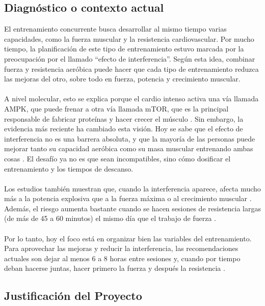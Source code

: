 \subsection{Diagnóstico o contexto actual}
El entrenamiento concurrente busca desarrollar al mismo tiempo varias capacidades, como la fuerza muscular y la resistencia cardiovascular. Por mucho tiempo, la planificación de este tipo de entrenamiento estuvo marcada por la preocupación por el llamado ``efecto de interferencia''. Según esta idea, combinar fuerza y resistencia aeróbica puede hacer que cada tipo de entrenamiento reduzca las mejoras del otro, sobre todo en fuerza, potencia y crecimiento muscular.
\\\\
A nivel molecular, esto se explica porque el cardio intenso activa una vía llamada AMPK, que puede frenar a otra vía llamada mTOR, que es la principal responsable de fabricar proteínas y hacer crecer el músculo \citep{aptavs2025concurrente}. Sin embargo, la evidencia más reciente ha cambiado esta visión. Hoy se sabe que el efecto de interferencia no es una barrera absoluta, y que la mayoría de las personas puede mejorar tanto su capacidad aeróbica como su masa muscular entrenando ambas cosas \citep{fisiologiadelejercicio}. El desafío ya no es que sean incompatibles, sino cómo dosificar el entrenamiento y los tiempos de descanso.
\\\\
Los estudios también muestran que, cuando la interferencia aparece, afecta mucho más a la potencia explosiva que a la fuerza máxima o al crecimiento muscular \citep{fisiologiadelejercicio}. Además, el riesgo aumenta bastante cuando se hacen sesiones de resistencia largas (de más de 45 a 60 minutos) el mismo día que el trabajo de fuerza \citep{aptavs2025concurrente}.
\\\\
Por lo tanto, hoy el foco está en organizar bien las variables del entrenamiento. Para aprovechar las mejoras y reducir la interferencia, las recomendaciones actuales son dejar al menos 6 a 8 horas entre sesiones \citep{aptavs2025concurrente, fisiologiadelejercicio} y, cuando por tiempo deban hacerse juntas, hacer primero la fuerza y después la resistencia \citep{aptavs2025concurrente}.
\subsection{Justificación del Proyecto}

